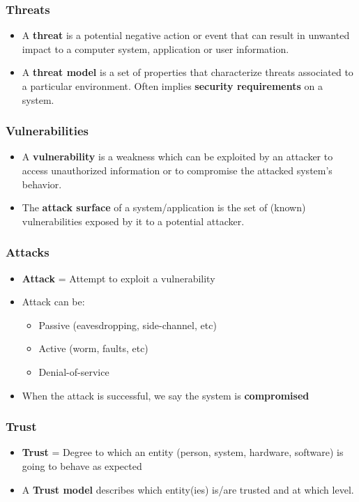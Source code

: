 \documentclass[
hyperref={pdfpagelabels=false}
,xcolor=table
]
{beamer}
\begin{document}
\begin{frame}
  \frametitle{Threats}
  \begin{itemize}
  \item A \textbf{threat} is a potential negative action or event that can
    result in unwanted impact to a computer system, application or
    user information.
  \item A \textbf{threat model} is a set of properties that characterize
    threats associated to a particular environment. Often implies
    \textbf{security requirements} on a system. 
  \end{itemize}
\end{frame}


\begin{frame}
  \frametitle{Vulnerabilities}
  \begin{itemize}
  \item A \textbf{vulnerability} is a weakness which can be exploited by an
    attacker to access unauthorized information or to compromise the
    attacked system's behavior. 
  \item The \textbf{attack surface} of a system/application is the set of
    (known) vulnerabilities exposed by it to a potential attacker.
  \end{itemize}
\end{frame}


\begin{frame}
  \frametitle{Attacks}
  \begin{itemize}
  \item \textbf{Attack} = Attempt to exploit a vulnerability
  \item Attack can be:
    \begin{itemize}
    \item Passive (eavesdropping, side-channel, etc)
    \item Active (worm, faults, etc)
    \item Denial-of-service
    \end{itemize}
  \item When the attack is successful, we say the system is \textbf{compromised} 
  \end{itemize}
\end{frame}


\begin{frame}
  \frametitle{Trust}
  \begin{itemize}
  \item \textbf{Trust} = Degree to which an entity (person, system, hardware, software) is going to behave as expected
  \item A \textbf{Trust model} describes which entity(ies) is/are
    trusted and at which level.
  \end{itemize}
\end{frame}
\end{document}

